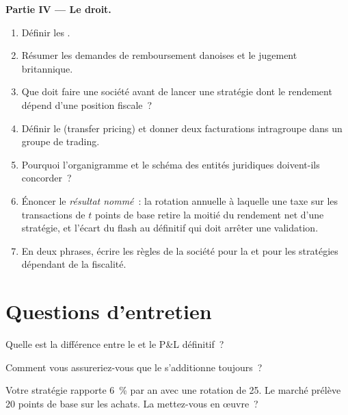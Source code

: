 \begin{problem}
\medskip\noindent\textbf{Partie IV --- Le droit.}
\begin{enumerate}[resume]
\item Définir les .
\item Résumer les demandes de remboursement danoises et le jugement britannique.
\item Que doit faire une société avant de lancer une stratégie dont le rendement dépend d'une position fiscale~?
\item Définir le  (transfer pricing) et donner deux facturations intragroupe dans un groupe de trading.
\item Pourquoi l'organigramme et le schéma des entités juridiques doivent-ils concorder~?
\item Énoncer le \emph{résultat nommé}~: la rotation annuelle à laquelle une taxe sur les transactions de $t$ points de base retire la moitié du rendement net d'une stratégie, et
l'écart du flash au définitif qui doit arrêter une validation.
\item En deux phrases, écrire les règles de la société pour la  et pour les stratégies dépendant de la fiscalité.
\end{enumerate}
\end{problem}

\section{Questions d'entretien}

\begin{interviewq}\label{iq:fm:finance-product-control-and-tax:1}
Quelle est la différence entre le  et le P\&L définitif~?
\end{interviewq}

\begin{interviewq}\label{iq:fm:finance-product-control-and-tax:2}
Comment vous assureriez-vous que le  s'additionne toujours~?
\end{interviewq}

\begin{interviewq}\label{iq:fm:finance-product-control-and-tax:3}
Votre stratégie rapporte 6~\% par an avec une rotation de 25. Le marché prélève 20 points de base sur les achats. La mettez-vous en œuvre~?
\end{interviewq}

